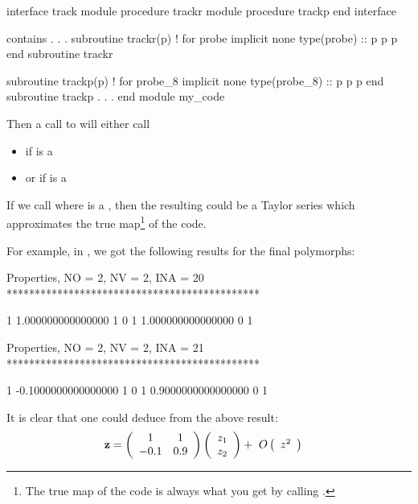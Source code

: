 \documentclass[english,12pt,article]{article} %
\begin{document}
{\begin{code}
  interface track
    module procedure trackr
    module procedure trackp 
  end interface

  contains
        .
        .
        .
  subroutine trackr(p) ! for probe
  implicit none
  type(probe) :: p
  p%
  p%
  end subroutine trackr
      
  subroutine trackp(p) ! for probe_8
  implicit none
  type(probe_8) :: p
  p%
  p%
  end subroutine trackp
          .
          .
          .
  end module my_code
\end{code}

Then a call to  will either call    
\begin{itemize} 
  \item {} if  is a 
  \item or  if  is a 
\end{itemize}  
    
If we call   where  is a  , then the resulting  could be a Taylor series which approximates the true map\footnote{The true map of the code is always what you get by calling .} of the code.
    
For example, in , we got the following results for the final polymorphs:
\begin{example1}
 Properties, NO =    2, NV =    2, INA =   20
 *********************************************

   1   1.000000000000000       1  0
   1   1.000000000000000       0  1


 Properties, NO =    2, NV =    2, INA =   21
 *********************************************

   1 -0.1000000000000000       1  0
   1  0.9000000000000000       0  1
\end{example1}

It is clear that one could deduce from the above result:
%
\begin{align} {\bf z}&=\left({\begin{array}{cc}1&1\\
-0.1&0.9\end{array}}\right)\left({\begin{array}{c} {z}_{1} \cr {z}_{2} \end{array}}\right)+\ O\left({\begin{array}{c}{z}^{2}\end{array}}\right) \label{eq:lin1}\end{align}

}
\end{document}
